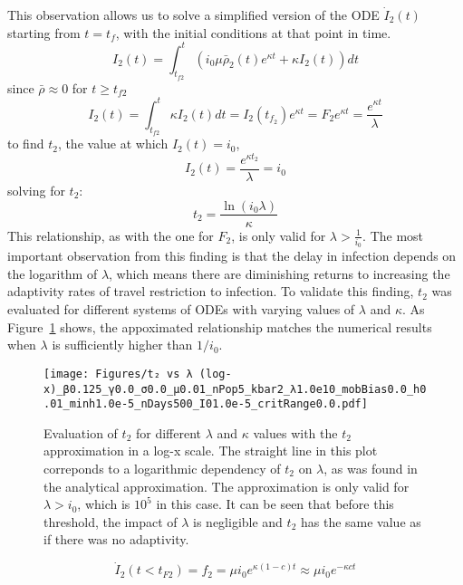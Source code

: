 \documentclass{article}
\begin{document}
This observation allows us to solve a simplified version of the ODE $\dot I_2(t)$ starting from $t=t_f$, with the initial conditions at that point in time.
\begin{equation} I_2(t) = \int_{t_{f2}}^t \left(i_{0} \mu \bar \rho_{2}{(t)} e^{\kappa t} + \kappa I_{2}{\left(t \right)}\right) dt\end{equation}
since $\bar \rho \approx 0$ for $t\ge t_{f2}$ 
\begin{equation}I_2(t) = \int_{t_{f2}}^t  \kappa I_{2}{\left(t \right)} dt = I_2(t_{f_2})e^{\kappa t} = F_2 e^{\kappa t} =\frac{e^{\kappa t}}{\lambda}\end{equation}
to find $t_2$, the value at which $I_2(t)=i_0$, 
\begin{equation}I_2(t) =\frac{e^{\kappa t_2}}{\lambda}=i_0\end{equation}
solving for $t_2$:
\begin{equation}t_2=\frac{\ln(i_0 \lambda)}{\kappa}\end{equation}
This relationship, as with the one for $F_2$, is only valid for $\lambda> \frac{1}{i_0}$. The most important observation from this finding is that the delay in infection depends on the logarithm of $\lambda$, which means there are diminishing returns to increasing the adaptivity rates of travel restriction to infection. To validate this finding, $t_2$ was evaluated for different systems of ODEs with varying values of $\lambda$ and $\kappa$. As Figure~\ref{fig:t_2 vs lambda} shows, the appoximated relationship matches the numerical results when $\lambda$ is sufficiently higher than $1/i_0$. 

\begin{figure}[!ht]
    \centering
    \texttt{[image: Figures/t₂ vs λ (log-x)\_β0.125\_γ0.0\_σ0.0\_μ0.01\_nPop5\_kbar2\_λ1.0e10\_mobBias0.0\_h0.01\_minh1.0e-5\_nDays500\_I01.0e-5\_critRange0.0.pdf]}
    \caption{\small Evaluation of $t_2$ for different $\lambda$ and $\kappa$ values with the $t_2$ approximation in a log-x scale. The straight line in this plot correponds to a logarithmic dependency of $t_2$ on $\lambda$, as was found in the analytical approximation. The approximation is only valid for $\lambda > i_0$, which is $10^5$ in this case. It can be seen that before this threshold, the impact of $\lambda$ is negligible and $t_2$ has the same value as if there was no adaptivity.}
    \label{fig:t_2 vs lambda}
\end{figure}


\begin{equation}\dot I_2(t<t_{F2}) = f_2 = \mu i_0 e^{\kappa (1-c) t} \approx \mu i_0 e^{-\kappa c t}\end{equation}
\end{document}
